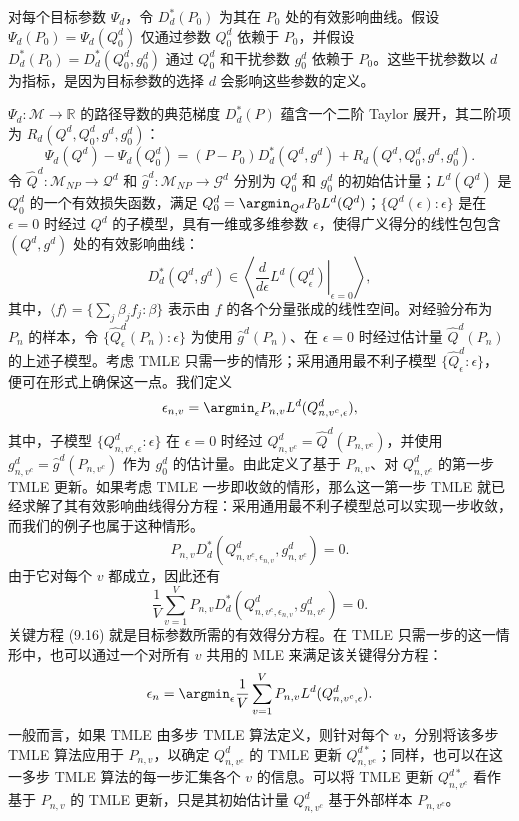 对每个目标参数 $\Psi_d$，令 $D_d^*(P_0)$ 为其在 $P_0$ 处的有效影响曲线。假设 $\Psi_d(P_0)=\Psi_d(Q_0^d)$ 仅通过参数 $Q_0^d$ 依赖于 $P_0$，并假设 $D_d^*(P_0)=D_d^*(Q_0^d,g_0^d)$ 通过 $Q_0^d$ 和干扰参数 $g_0^d$ 依赖于 $P_0$。这些干扰参数以 $d$ 为指标，是因为目标参数的选择 $d$ 会影响这些参数的定义。

$\Psi_d:\mathcal M\to\mathbb R$ 的路径导数的典范梯度 $D_d^*(P)$ 蕴含一个二阶 Taylor 展开，其二阶项为 $R_d(Q^d,Q_0^d,g^d,g_0^d)$：
\[
\Psi_d(Q^d)-\Psi_d(Q_0^d)
=(P-P_0)D_d^*(Q^d,g^d)+R_d(Q^d,Q_0^d,g^d,g_0^d).
\]
令 $\hat Q^d:\mathcal M_{NP}\to\mathcal Q^d$ 和 $\hat g^d:\mathcal M_{NP}\to\mathcal G^d$ 分别为 $Q_0^d$ 和 $g_0^d$ 的初始估计量；$L^d(Q^d)$ 是 $Q_0^d$ 的一个有效损失函数，满足 $Q_0^d=\argmin_{Q^d}P_0L^d(Q^d)$；$\{Q^d(\epsilon):\epsilon\}$ 是在 $\epsilon=0$ 时经过 $Q^d$ 的子模型，具有一维或多维参数 $\epsilon$，使得广义得分的线性包包含 $(Q^d,g^d)$ 处的有效影响曲线：
\[
D_d^*(Q^d,g^d)\in
\left\langle\left.\frac{d}{d\epsilon}L^d(Q_\epsilon^d)\right|_{\epsilon=0}\right\rangle,
\]
其中，$\langle f\rangle=\{\sum_j\beta_j f_j:\beta\}$ 表示由 $f$ 的各个分量张成的线性空间。对经验分布为 $P_n$ 的样本，令 $\{\hat Q_\epsilon^d(P_n):\epsilon\}$ 为使用 $\hat g^d(P_n)$、在 $\epsilon=0$ 时经过估计量 $\hat Q^d(P_n)$ 的上述子模型。考虑 TMLE 只需一步的情形；采用通用最不利子模型 $\{\hat Q_\epsilon^d:\epsilon\}$，便可在形式上确保这一点。我们定义
\[
\epsilon_{n,v}=\argmin_{\epsilon}P_{n,v}L^d(Q^d_{n,v^c,\epsilon}),
\]
其中，子模型 $\{Q^d_{n,v^c,\epsilon}:\epsilon\}$ 在 $\epsilon=0$ 时经过 $Q^d_{n,v^c}=\hat Q^d(P_{n,v^c})$，并使用 $g^d_{n,v^c}=\hat g^d(P_{n,v^c})$ 作为 $g_0^d$ 的估计量。由此定义了基于 $P_{n,v}$、对 $Q^d_{n,v^c}$ 的第一步 TMLE 更新。如果考虑 TMLE 一步即收敛的情形，那么这一第一步 TMLE 就已经求解了其有效影响曲线得分方程：采用通用最不利子模型总可以实现一步收敛，而我们的例子也属于这种情形。
\[
P_{n,v}D_d^*(Q^d_{n,v^c,\epsilon_{n,v}},g^d_{n,v^c})=0.
\]
由于它对每个 $v$ 都成立，因此还有
\begin{equation}
\frac1V\sum_{v=1}^V P_{n,v}D_d^*(Q^d_{n,v^c,\epsilon_{n,v}},g^d_{n,v^c})=0.
\tag{9.16}
\end{equation}
关键方程 (9.16) 就是目标参数所需的有效得分方程。在 TMLE 只需一步的这一情形中，也可以通过一个对所有 $v$ 共用的 MLE 来满足该关键得分方程：
\[
\epsilon_n=\argmin_{\epsilon}\frac1V\sum_{v=1}^V P_{n,v}L^d(Q^d_{n,v^c,\epsilon}).
\]
一般而言，如果 TMLE 由多步 TMLE 算法定义，则针对每个 $v$，分别将该多步 TMLE 算法应用于 $P_{n,v}$，以确定 $Q^d_{n,v^c}$ 的 TMLE 更新 $Q^{d*}_{n,v^c}$；同样，也可以在这一多步 TMLE 算法的每一步汇集各个 $v$ 的信息。可以将 TMLE 更新 $Q^{d*}_{n,v^c}$ 看作基于 $P_{n,v}$ 的 TMLE 更新，只是其初始估计量 $Q^d_{n,v^c}$ 基于外部样本 $P_{n,v^c}$。

